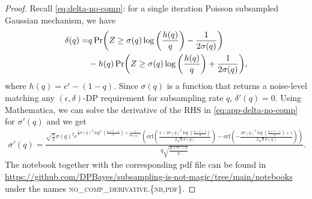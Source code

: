 \documentclass{article}
\theoremstyle{plain}
\theoremstyle{definition}
\theoremstyle{remark}
\begin{document}
\lemmanocompderivative*
\begin{proof}
Recall \cref{eq:delta-no-comp}: for a single iteration Poisson 
subsampled Gaussian mechanism, we have 
\begin{equation}
    \label{eq:app-delta-no-comp}
    \begin{split}
        \delta(q) = &q\Pr (Z  \geq \sigma(q) \log \left( \frac{h(q)}{q} \right) - \frac{1}{2\sigma(q)}) \\
           &-h(q) \Pr(Z  \geq \sigma(q) \log \left( \frac{h(q)}{q} \right) + \frac{1}{2\sigma(q)}),
    \end{split}
\end{equation}
where $h(q) = e^\epsilon - (1-q)$. Since $\sigma(q)$ is a function that returns
a noise-level matching any $(\epsilon, \delta)$-DP requirement for subsampling rate
$q$, $\delta'(q) = 0$. Using Mathematica, we can solve the derivative of the RHS
in \cref{eq:app-delta-no-comp} for $\sigma'(q)$ and we get
\begin{align}
    \sigma'(q) = \frac{\sqrt{\frac{\pi }{2}} \sigma(q)^2 e^{\frac{1}{2} \sigma(q)^2 \log ^2\left(\frac{q+e^{\epsilon }-1}{q}\right)+\frac{1}{8 \sigma(q)^2}} \left(\text{erf}\left(\frac{1-2 \sigma(q)^2 \log \left(\frac{q+e^{\epsilon }-1}{q}\right)}{2 \sqrt{2} \sigma(q)}\right)-\text{erf}\left(-\frac{2 \sigma(q)^2 \log \left(\frac{q+e^{\epsilon }-1}{q}\right)+1}{2 \sqrt{2} \sigma(q)}\right)\right)}{q \sqrt{\frac{q+e^{\epsilon }-1}{q}}}.
\end{align}
The notebook together with the corresponding pdf file can be found in \url{https://github.com/DPBayes/subsampling-is-not-magic/tree/main/notebooks} under the names \textsc{no\_comp\_derivative.\{nb,pdf\}}.


\end{proof}
\end{document}
